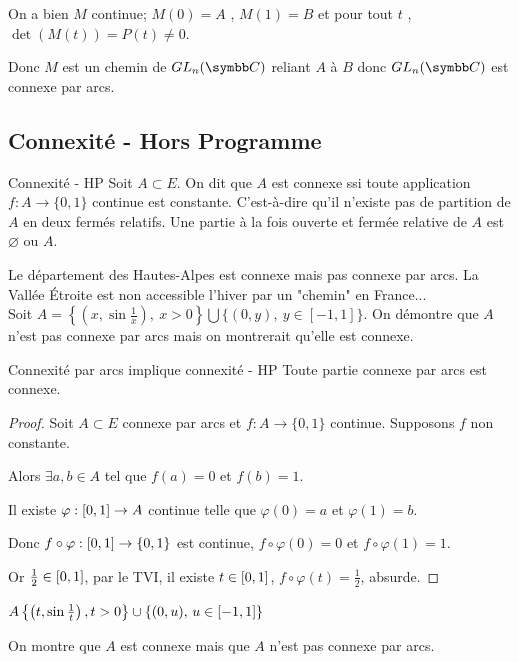 On a bien $M$ continue; $M(0)=A$ , $M(1)=B$ et pour tout $t$ , $\det(M(t))=P(t) \neq 0$.

Donc $M$ est un chemin de $GL_n(\C)$ reliant $A$ à $B$ donc $GL_n(\C)$ est connexe par arcs.

\subsection{Connexité - Hors Programme}

\begin{definition}{Connexité - HP}{}
    Soit $A \subset E$. 
    On dit que $A$ est connexe ssi toute application $f : A \to \{0, 1\}$ continue est constante. 
    C'est-à-dire qu'il n'existe pas de partition de $A$ en deux fermés relatifs.
    Une partie à la fois ouverte et fermée relative de $A$ est $\varnothing$ ou $A$.
\end{definition}

\begin{exemple}
    Le département des Hautes-Alpes est connexe mais pas connexe par arcs.
    La Vallée Étroite est non accessible l'hiver par un "chemin" en France... \\

    Soit $A = \left\{\left(x, \sin{\frac 1 x}\right),~x > 0\right\} \bigcup \{(0,y),~y\in [-1,1]\}$. On démontre que $A$ n'est pas connexe par arcs mais on montrerait qu'elle est connexe. 
\end{exemple}

\begin{proposition}{Connexité par arcs implique connexité - HP}{}
    Toute partie connexe par arcs est connexe. 
\end{proposition}


\begin{proof}
    Soit $A \subset E$ connexe par arcs et $f : A \to \{0, 1\}$ continue. Supposons $f$ non constante. 

    Alors $\exists a, b \in A$ tel que $f(a) = 0$ et $f(b) = 1$.

    Il existe $\varphi : \left[0, 1\right] \to A$ continue telle que $\varphi(0) = a$ et $\varphi(1) = b$.

    Donc $f \circ \varphi : \left[0, 1\right] \to \{0, 1\}$ est continue, $f \circ \varphi(0) = 0$ et $f \circ \varphi (1) = 1$. 

    Or $\frac 1 2 \in \left[0, 1\right]$, par le TVI, il existe $t \in \left[0, 1\right]$, $f \circ \varphi (t) = \frac 1 2$, absurde. 
\end{proof}

\begin{exemple}
    $A \left\{\left(t, \sin \frac 1 t\right), t > 0\right\} \cup \{(0, u), \, u \in \left[-1, 1\right]\}$

    On montre que $A$ est connexe mais que $A$ n'est pas connexe par arcs.
\end{exemple}
